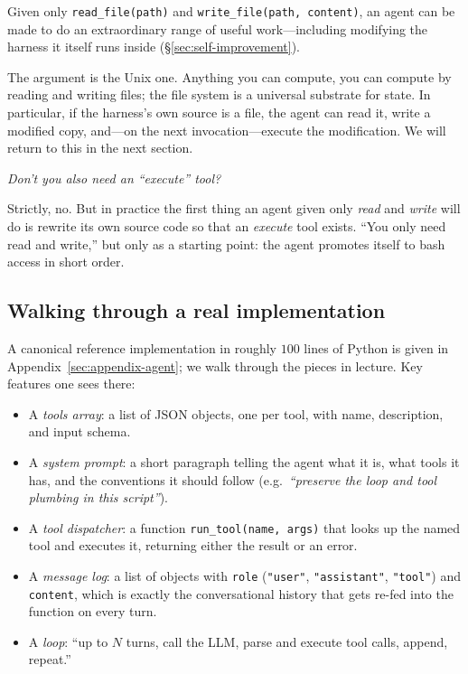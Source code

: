 \begin{keyresult}
  Given only \texttt{read\_file(path)} and \texttt{write\_file(path,
  content)}, an agent can be made to do an extraordinary range of
  useful work---including modifying the harness it itself runs
  inside (\S\ref{sec:self-improvement}).
\end{keyresult}

The argument is the Unix one.  Anything you can compute, you
can compute by reading and writing files; the file system is a
universal substrate for state.  In particular, if the harness's
own source is a file, the agent can read it, write a modified
copy, and---on the next invocation---execute the modification.
We will return to this in the next section.

\begin{audience}
  \emph{Don't you also need an ``execute'' tool?}

  Strictly, no.  But in practice the first thing an agent given
  only \emph{read} and \emph{write} will do is rewrite its own
  source code so that an \emph{execute} tool exists.  ``You only
  need read and write,'' but only as a starting point: the agent
  promotes itself to bash access in short order.
\end{audience}

\subsection{Walking through a real implementation}

A canonical reference implementation in roughly $100$ lines of
Python is given in
Appendix~\ref{sec:appendix-agent}; we walk through the pieces
in lecture.  Key features one sees there:

\begin{itemize}
  \item A \emph{tools array}: a list of JSON objects, one per
    tool, with name, description, and input schema.
  \item A \emph{system prompt}: a short paragraph telling the
    agent what it is, what tools it has, and the conventions it
    should follow (e.g.\ \emph{``preserve the loop and tool
    plumbing in this script''}).
  \item A \emph{tool dispatcher}: a function \texttt{run\_tool(name,
    args)} that looks up the named tool and executes it,
    returning either the result or an error.
  \item A \emph{message log}: a list of objects with \texttt{role}
    (\texttt{"user"}, \texttt{"assistant"}, \texttt{"tool"}) and
    \texttt{content}, which is exactly the conversational history
    that gets re-fed into the function on every turn.
  \item A \emph{loop}: ``up to $N$ turns, call the LLM, parse and
    execute tool calls, append, repeat.''
\end{itemize}

